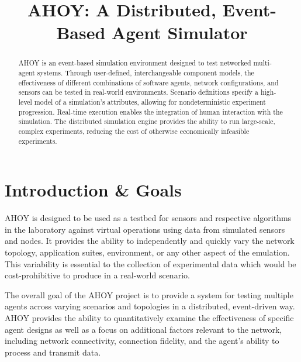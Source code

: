 \documentclass[conference]{IEEEtran}
\begin{document}
\title{AHOY: A Distributed, Event-Based Agent Simulator}
\author{
}

\maketitle

\begin{abstract}
AHOY is an event-based simulation environment designed to test networked multi-agent systems. Through user-defined, interchangeable component models, the effectiveness of different combinations of software agents, network configurations, and sensors can be tested in real-world environments. Scenario definitions specify a high-level model of a simulation's attributes, allowing for nondeterministic experiment progression. Real-time execution enables the integration of human interaction with the simulation. The distributed simulation engine provides the ability to run large-scale, complex experiments, reducing the cost of otherwise economically infeasible experiments.
\end{abstract}

\section{Introduction \& Goals}
AHOY is designed to be used as a testbed for sensors and respective algorithms in the laboratory against virtual operations using data from simulated sensors and nodes. It provides the ability to independently and quickly vary the network topology, application suites, environment, or any other aspect of the emulation. This variability is essential to the collection of experimental data which would be cost-prohibitive to produce in a real-world scenario.

The overall goal of the AHOY project is to provide a system for testing multiple agents across varying scenarios and topologies in a distributed, event-driven way. AHOY provides the ability to quantitatively examine the effectiveness of specific agent designs as well as a focus on additional factors relevant to the network, including network connectivity, connection fidelity, and the agent's ability to process and transmit data.
\end{document}
